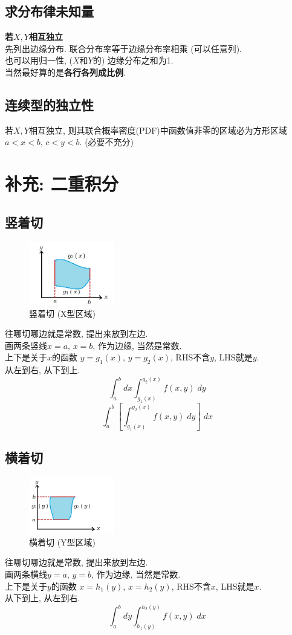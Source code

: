 \documentclass[a4paper]{report}
\begin{document}
\subsection{求分布律未知量}
\textbf{若$X,Y$相互独立}\\
先列出边缘分布. 联合分布率等于边缘分布率相乘 (可以任意列). \\
也可以用归一性, ($X$和$Y$的) 边缘分布之和为1. \\
当然最好算的是\textbf{各行各列成比例}. \\
\subsection{连续型的独立性}
若$X,Y$相互独立, 则其联合概率密度(PDF)中函数值非零的区域必为方形区域$a<x<b,\, c<y<b$. (必要不充分)

\section{补充: 二重积分}
\subsection{竖着切}
\begin{figure}[H]
\centering
\includegraphics[width=0.33\textwidth]{cut_x.png}
\caption{竖着切 (X型区域)}
\end{figure}
往哪切哪边就是常数, 提出来放到左边. \\
画两条竖线$x=a,\,x=b$, 作为边缘, 当然是常数. \\
上下是关于$x$的函数 $y=g_1(x),\,y=g_2(x)$, RHS不含$y$, LHS就是$y$. \\
从左到右, 从下到上.
$$\int_a^b dx\int_{g_1(x)}^{g_2(x)}f(x,y)\;dy$$
$$\int_a^b [\int_{g_1(x)}^{g_2(x)}f(x,y)\;dy]\;dx$$
\subsection{横着切}
\begin{figure}[H]
\centering
\includegraphics[width=0.33\textwidth]{cut_y.png}
\caption{横着切 (Y型区域)}
\end{figure}
往哪切哪边就是常数, 提出来放到左边. \\
画两条横线$y=a,\,y=b$, 作为边缘, 当然是常数. \\
上下是关于$y$的函数 $x=h_1(y),\,x=h_2(y)$, RHS不含$x$, LHS就是$x$. \\
从下到上, 从左到右. 
$$\int_a^b dy\int_{h_1(y)}^{h_2(y)}f(x,y)\;dx$$
\end{document}
